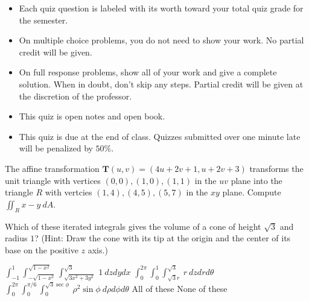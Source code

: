 \documentclass[12pt]{exam}
\newcommand{\vect}[1]{\ensuremath{\mathbf{#1}}}
\newcommand{\<}{(}
\renewcommand{\>}{)}
\begin{document}
\begin{center}
\end{center}
\vspace{0.1in}

\vspace{12pt}

\begin{itemize}
  \item Each quiz question is labeled with its worth toward your total quiz
        grade for the semester.
  \item On multiple choice problems, you do not need to show your work. No
        partial credit will be given.
  \item On full response problems, show all of your work and give a
        complete solution. When in doubt, don't skip any steps. Partial
        credit will be given at the discretion of the professor.
  \item This quiz is open notes and open book.
  \item This quiz is due at the end of class. Quizzes submitted over one minute
        late will be penalized by \(50\%\).
\end{itemize}

\newpage

\begin{questions}

\question[10]
The affine transformation \(\vect T(u,v)=(4u+2v+1,u+2v+3)\) transforms
the unit triangle with vertices \((0,0), (1,0), (1,1)\) in the \(uv\) plane
into the triangle \(R\) with vertcies \((1,4), (4,5), (5,7)\) in the \(xy\)
plane. Compute \(\iint_R x-y~dA\).

\vfill

\question[10]
Which of these iterated integrals gives the volume of a cone
of height \(\sqrt 3\) and radius \(1\)? (Hint: Draw the cone with its
tip at the origin and the center of its base on the positive \(z\) axis.)

\begin{checkboxes}
\choice \(\int_{-1}^1\int_{-\sqrt{1-x^2}}^{\sqrt{1-x^2}}\int_{\sqrt{3x^2+3y^2}}^{\sqrt 3} ~1~dzdydx\)
\choice \(\int_0^{2\pi}\int_0^1\int_{\sqrt{3}r}^{\sqrt 3}~r~dzdrd\theta\)
\choice \(\int_0^{2\pi}\int_0^{\pi/6}\int_0^{\sqrt{3}\sec\phi}~\rho^2\sin\phi~d\rho d\phi d\theta\)
\choice All of these
\choice None of these
\end{checkboxes}



\end{questions}
\end{document}
